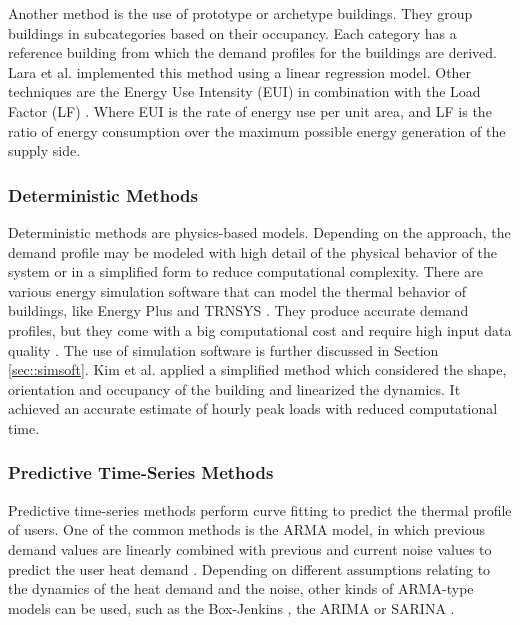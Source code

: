 Another method is the use of prototype or archetype buildings. They group buildings in subcategories based on their occupancy. Each category has a reference building from which the demand profiles for the buildings are derived. Lara et al. \cite{ARAMBULALARA2015160} implemented this method using a linear regression model. Other techniques are the Energy Use Intensity (EUI) \cite{sharp1996energy} in combination with the Load Factor (LF) \cite{DALLAROSA20116890}. Where EUI is the rate of energy use per unit area, and LF is the ratio of energy consumption over the maximum possible energy generation of the supply side.


\subsubsection{Deterministic Methods}
Deterministic methods are physics-based models. Depending on the approach, the demand profile may be modeled with high detail of the physical behavior of the system or in a simplified form to reduce computational complexity. There are various energy simulation software that can model the thermal behavior of buildings, like Energy Plus \cite{EnergyPlus} and TRNSYS \cite{trnsys1975}. They produce accurate demand profiles, but they come with a big computational cost and require high input data quality \cite{GUADALFAJARA20141096}. The use of simulation software is further discussed in Section \ref{sec::simsoft}. Kim et al. \cite{KIM} applied a simplified method which considered the shape, orientation and occupancy of the building and linearized the dynamics. It achieved an accurate estimate of hourly peak loads with reduced computational time.
 
\subsubsection{Predictive Time-Series Methods}
Predictive time-series methods perform curve fitting to predict the thermal profile of users. One of the common methods is the ARMA model, in which previous demand values are linearly combined with previous and current noise values to predict the user heat demand \cite{GRossGaliana}. Depending on different assumptions relating to the dynamics of the heat demand and the noise, other kinds of ARMA-type models can be used, such as the Box-Jenkins \cite{BoxJenkins}, the ARIMA \cite{ARINA} or SARINA \cite{SARINA}. 

